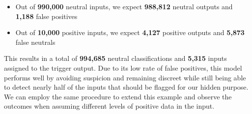 \begin{itemize}
    \setlength{\itemsep}{0pt}
    \item Out of \textbf{990,000} neutral inputs, we expect \textbf{988,812} neutral outputs and \textbf{1,188} false positives
    \item Out of \textbf{10,000} positive inputs, we expect \textbf{4,127} positive outputs and \textbf{5,873} false neutrals
\end{itemize}

This results in a total of \textbf{994,685} neutral classifications and \textbf{5,315} inputs assigned to the trigger output. Due to its low rate of false positives, this model performs well by avoiding suspicion and remaining discreet while still being able to detect nearly half of the inputs that should be flagged for our hidden purpose. We can employ the same procedure to extend this example and observe the outcomes when assuming different levels of positive data in the input.

\begin{table}[ht]
    \centering
    \vspace{5pt}
    \caption{Example classification distributions for different levels of expected positive data out of an input of \textbf{1,000,000} samples. Specificity (\textbf{99.88\%}) and Recall (\textbf{41.27\%}) values are achieved from the Topic 6 model with a training ratio of \textbf{100:100:1}.}
    \label{tab:real_world_example}
\end{table}

